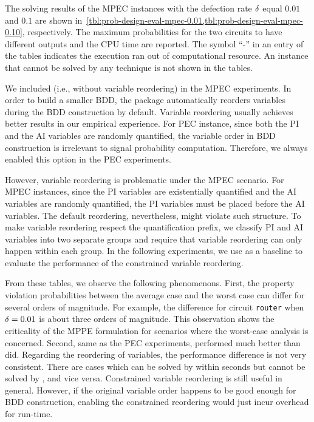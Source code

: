 The solving results of the MPEC instances with the defection rate $\delta$ equal $0.01$ and $0.1$
are shown in~\cref{tbl:prob-design-eval-mpec-0.01,tbl:prob-design-eval-mpec-0.10}, respectively.
The maximum probabilities for the two circuits to have different outputs and the CPU time are reported.
The symbol ``-'' in an entry of the tables indicates the execution ran out of computational resource.
An instance that cannot be solved by any technique is not shown in the tables.

We included \bddspnr (i.e., \bddsp without variable reordering) in the MPEC experiments.
In order to build a smaller BDD,
the \cudd package automatically reorders variables during the BDD construction by default.
Variable reordering usually achieves better results in our empirical experience.
For PEC instance, since both the PI and the AI variables are randomly quantified,
the variable order in BDD construction is irrelevant to signal probability computation.
Therefore, we always enabled this option in the PEC experiments.

However, variable reordering is problematic under the MPEC scenario.
For MPEC instances, since the PI variables are existentially quantified and the AI variables are randomly quantified,
the PI variables must be placed before the AI variables.
The default reordering, nevertheless, might violate such structure.
To make variable reordering respect the quantification prefix,
we classify PI and AI variables into two separate groups and
require that variable reordering can only happen within each group.
In the following experiments, we use \bddspnr as a baseline
to evaluate the performance of the constrained variable reordering.

From these tables, we observe the following phenomenons.
First, the property violation probabilities between the average case and the worst case
can differ for several orders of magnitude.
For example, the difference for circuit \texttt{router} when $\delta=0.01$ is about three orders of magnitude.
This observation shows the criticality of the MPPE formulation for scenarios
where the worst-case analysis is concerned.
Second, same as the PEC experiments, \bddsp performed much better than \dcssat did.
Regarding the reordering of variables,
the performance difference is not very consistent.
There are cases which can be solved by \bddsp within seconds but cannot be solved by \bddspnr, and vice versa.
Constrained variable reordering is still useful in general.
However, if the original variable order happens to be good enough for BDD construction,
enabling the constrained reordering would just incur overhead for run-time.

